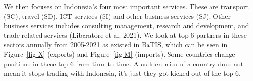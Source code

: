 \documentclass[
  a4paper,
  DIV=11,
  numbers=noendperiod]{scrreprt}
\begin{document}
We then focuses on Indonesia's four most important services. These are
transport (SC), travel (SD), ICT services (SI) and other business
services (SJ). Other business services includes consulting management,
research and development, and trade-related services (Liberatore et al.
2021). We look at top 6 partners in these sectors annually from
2005-2021 as existed in BaTIS, which can be seen in Figure~\ref{fig-X}
(exports) and Figure~\ref{fig-M} (imports). Some countries change
positions in these top 6 from time to time. A sudden miss of a country
does not mean it stops trading with Indonesia, it's just they got kicked
out of the top 6.

\begin{figure}

\begin{minipage}{0.50\linewidth}



\end{minipage}%
%
\begin{minipage}{0.50\linewidth}

\end{minipage}
\end{figure}
\end{document}
